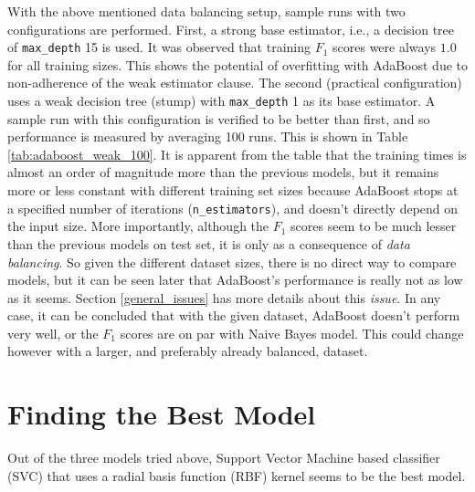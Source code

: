 \documentclass{article}
\begin{document}
	With the above mentioned data balancing setup, sample runs with two configurations are performed. First, a strong base estimator, i.e., a decision tree of \texttt{max\_depth} 15 is used. It was observed that training $F_1$ scores were always $1.0$ for all training sizes. This shows the potential of overfitting with AdaBoost due to non-adherence of the weak estimator clause. The second (practical configuration) uses a weak decision tree (stump) with \texttt{max\_depth} 1 as its base estimator. A sample run with this configuration is verified to be better than first, and so performance is measured by averaging 100 runs. This is shown in Table \ref{tab:adaboost_weak_100}. It is apparent from the table that the training times is almost an order of magnitude more than the previous models, but it remains more or less constant with different training set sizes because AdaBoost stops at a specified number of iterations (\texttt{n\_estimators}), and doesn't directly depend on the input size. More importantly, although the $F_1$ scores seem to be much lesser than the previous models on test set, it is only as a consequence of \emph{data balancing}. So given the different dataset sizes, there is no direct way to compare models, but it can be seen later that AdaBoost's performance is really not as low as it seems. Section \ref{general_issues} has more details about this \emph{issue}. In any case, it can be concluded that with the given dataset, AdaBoost doesn't perform very well, or the $F_1$ scores are on par with Naive Bayes model. This could change however with a larger, and preferably already balanced, dataset.
		
	\section{Finding the Best Model}
	Out of the three models tried above, Support Vector Machine based classifier (SVC) that uses a radial basis function (RBF) kernel seems to be the best model. 
	
\end{document}
